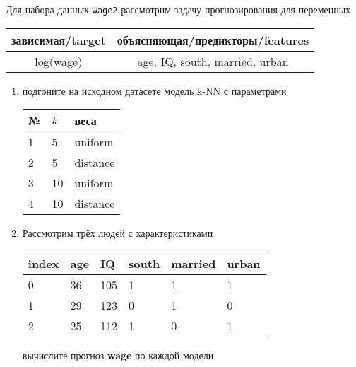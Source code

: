 \begin{exercise}
Для набора данных \texttt{wage2} рассмотрим задачу прогнозирования
для переменных
\begin{center}
	\begin{tabular}{|c|c|}\hline
		зависимая/target & объясняющая/предикторы/features \\ \hline
		log(wage) & age, IQ, south, married, urban \\ \hline
	\end{tabular}
\end{center}
\begin{enumerate}
	\item подгоните на исходном датасете модель k-NN с параметрами
	\begin{center}
		\begin{tabular}{|l|l|l|}\hline
		№ & \(k\) & веса \\ \hline
		1 & 5 & uniform \\
		2 & 5 & distance \\
		3 & 10 & uniform \\
		4 & 10 & distance \\ \hline
		\end{tabular}
	\end{center}
	\item Рассмотрим трёх людей с характеристиками
	\begin{center}
		\begin{tabular}{|l||l|l|l|l|l|}\hline
			index & age & IQ & south & married & urban \\ \hline\hline
			0 & 36 & 105 & 1 & 1 & 1 \\
			1 & 29 & 123 & 0 & 1 & 0 \\
			2 & 25 & 112 & 1 & 0 & 1 \\ \hline
		\end{tabular}
	\end{center}
	вычислите прогноз \textbf{wage} по каждой модели
\end{enumerate}
\end{exercise}

